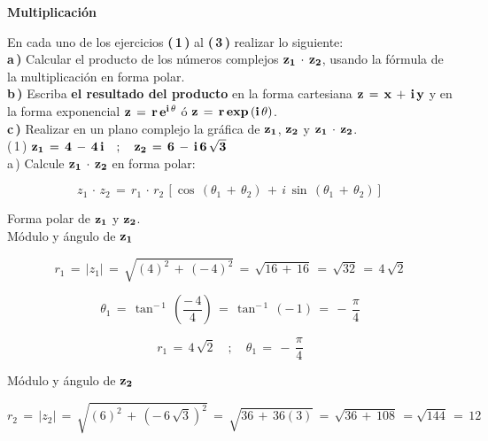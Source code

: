 \documentclass[a4paper,11pt,openany]{book}
\begin{document}
\newpage


\graphicspath{ {images/} }

\begin{center}
\textbf{Multiplicación}
\end{center}

En cada uno de los ejercicios \textbf{(\,1\,)} al \textbf{(\,3\,)} realizar lo siguiente:\\

\textbf{a\,)} Calcular el producto de los números complejos $\bf{z_{1}\,\cdot\,z_{2}}$, usando la fórmula de la multiplicación en forma polar.\\

\textbf{b\,)} Escriba \textbf{el resultado del producto} en la forma cartesiana $\bf{z\,=\,x\,+\,i\,y}$ y en la forma exponencial $\bf{z\,=\,r\,e^{i\,\theta}}$ ó $\bf{z\,=\,r\,exp\,(i\,\theta)}$.\\

\textbf{c\,)} Realizar en un plano complejo la gráfica de $\bf{z_{1}}$, $\bf{z_{2}}$ y $\bf{z_{1}\,\cdot\,z_{2}}$.\\

\textcolor{ao(english)}{(\,1\,)} $\bf{z_{1}\,=\,4\,-\,4\,i \quad;\quad z_{2}\,=\,6\,-\,i\,6\,\sqrt{3}}$\\

\textcolor{ao(english)}{a\,)} Calcule $\bf{z_{1}\,\cdot\,z_{2}}$ en forma polar:

$$z_{1}\,\cdot\,z_{2}\,=\,r_{1}\,\cdot\,r_{2}\,\left[\cos\,(\theta_{1}\,+\,\theta_{2})\,+\,i\,\sin\,(\theta_{1}\,+\,\theta_{2})\right]$$

\textcolor{ao(english)}{} Forma polar de $\bf{z_{1}}$ y $\bf{z_{2}}$.\\

\textcolor{ao(english)}{} Módulo y ángulo de $\bf{z_{1}}$ 

$$r_{1}\,=\,|z_{1}|\,=\,\sqrt{(4)^{2}\,+\,(-\,4)^{2}}\,=\,\sqrt{16\,+\,16}\,=\,\sqrt{32}\,=\,4\,\sqrt{2}$$

$$\theta_{1}\,=\,\tan^{-\,1}\,\left(\dfrac{-\,4}{4}\right)\,=\,\tan^{-\,1}\,(-\,1)\,=\,-\,\dfrac{\pi}{4}$$

$$\boxed{r_{1}\,=\,4\,\sqrt{2} \quad;\quad \theta_{1}\,=\,-\,\dfrac{\pi}{4}}$$

\textcolor{ao(english)}{} Módulo y ángulo de $\bf{z_{2}}$ 

$$r_{2}\,=\,|z_{2}|\,=\,\sqrt{(6)^{2}\,+\,\left(-\,6\,\sqrt{3}\right)^{2}}\,=\,\sqrt{36\,+\,36(3)}\,=\,\sqrt{36\,+\,108}\,=\sqrt{144}\,=\,12$$
\end{document}

